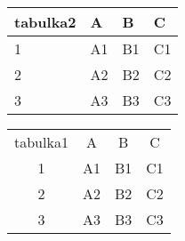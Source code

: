\documentclass{article}
\begin{document}
\begin{center}
\begin{tabular}{ | m{5em} | m{1cm}| m{1cm} | m{1cm} |} 
 \hline
  tabulka2 & A & B & C \\ 
  \hline
  1 & A1 & B1 & C1 \\ 
  \hline
  2 & A2 & B2 & C2 \\ 
  \hline
  3 & A3 & B3 & C3 \\ 
  \hline
\end{tabular}
\end{center}

\begin{center}
\begin{tabular}{ c c c c }
tabulka1 & A & B & C \\ 
 1 & A1 & B1 & C1 \\  
 2 & A2 & B2 & C2 \\
 3 & A3 & B3 & C3
\end{tabular}
\end{center}
\end{document}

